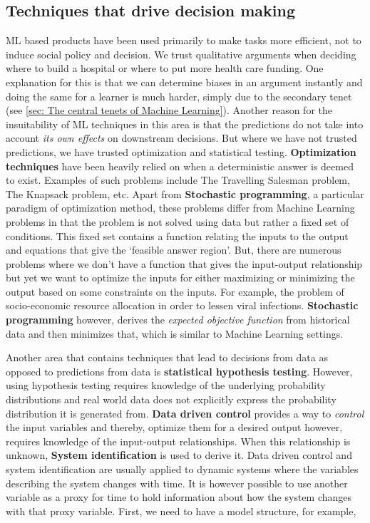 \documentclass[12pt, letterpaper]{article}
\begin{document}
\subsection{Techniques that drive decision making}
ML based products have been used primarily to make tasks more efficient, not to
induce social policy and decision. We trust qualitative arguments when deciding
where to build a hospital or where to put more health care funding. One
explanation for this is that we can determine biases in an argument instantly
and doing the same for a learner is much harder, simply due to the secondary
tenet (see \ref{sec: The central tenets of Machine Learning}). Another reason
for the insuitability of ML techniques in this area is that the predictions do
not take into account \textit{its own effects} on downstream decisions. But
where we have not trusted predictions, we have trusted optimization and
statistical testing. \textbf{Optimization techniques} have been heavily relied
on when a deterministic answer is deemed to exist. Examples of such problems
include The Travelling Salesman problem, The Knapsack problem, etc. Apart from
\textbf{Stochastic programming}, a particular paradigm of optimization method,
these problems differ from Machine Learning problems in that the problem is not
solved using data but rather a fixed set of conditions. This fixed set contains
a function relating the inputs to the output and equations that give the
`feasible answer region'. But, there are numerous problems where we don't have a
function that gives the input-output relationship but yet we want to optimize
the inputs for either maximizing or minimizing the output based on some
constraints on the inputs. For example, the problem of socio-economic resource
allocation in order to lessen viral infections. \textbf{Stochastic programming}
however, derives the \textit{expected objective function} from historical data
and then minimizes that, which is similar to Machine Learning settings. 

Another area that contains techniques that lead to decisions from data as
opposed to predictions from data is \textbf{statistical hypothesis testing}.
However, using hypothesis testing requires knowledge of the underlying
probability distributions and real world data does not explicitly express the
probability distribution it is generated from. \textbf{Data driven control}
provides a way to \textit{control} the input variables and thereby, optimize
them for a desired output however, requires knowledge of the input-output
relationships. When this relationship is unknown, \textbf{System identification}
is used to derive it. Data driven control and system identification are usually
applied to dynamic systems where the variables describing the system changes
with time. It is however possible to use another variable as a proxy for time to
hold information about how the system changes with that proxy variable. First,
we need to have a model structure, for example,
\end{document}
